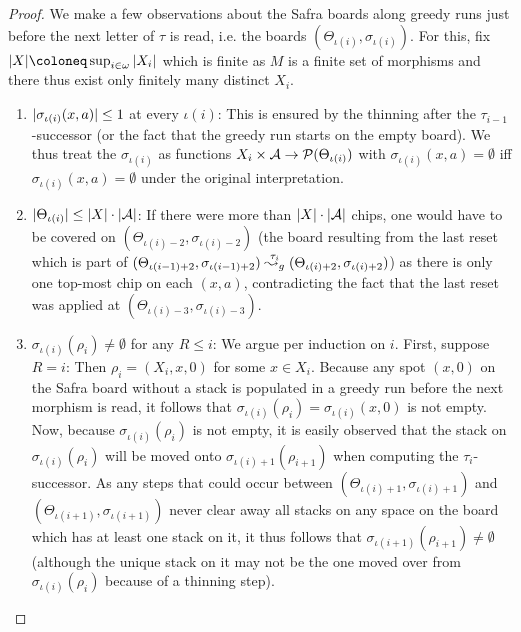 \begin{proof}
  We make a few observations about the Safra boards along greedy runs just
  before the next letter of $\tau$ is read, i.e. the boards $(\Theta_{\iota(i)},
  \sigma_{\iota(i)})$. For this, fix $\abs{X} \coloneq
  \sup_{i \in \omega} \abs{X_i}$ which is finite as $M$ is a finite set
  of morphisms and there thus exist only finitely many distinct $X_i$.
  \begin{enumerate}
  \item 
    $|\sigma_{\iota(i)}(x, a)| \leq 1$ at every $\iota(i)$: This is ensured
    by the thinning after the $\tau_{i - 1}$-successor (or the fact that the
    greedy run starts on the empty board).
    We thus
    treat the $\sigma_{\iota(i)}$ as functions $X_i \times \mathcal{A} \to
    \mathcal{P}(\Theta_{\iota(i)})$ with $\sigma_{\iota(i)}(x, a) =
    \emptyset$ iff $\sigma_{\iota(i)}(x, a) = \emptyset$ under the original
    interpretation.
  \item 
    $|\Theta_{\iota(i)}| \leq |X| \cdot |\mathcal{A}|$: If there were
    more than $|X| \cdot |\mathcal{A}|$ chips, one would have to be covered on
    $(\Theta_{\iota(i) - 2}, \sigma_{\iota(i) - 2})$ (the board resulting from
    the last reset which is part of $(\Theta_{\iota(i - 1) + 2}, \sigma_{\iota(i
      - 1) + 2}) \stackrel{\tau_i}{\leadsto_g} (\Theta_{\iota(i) + 2}, \sigma_{\iota(i) + 2})$) as there is only one
    top-most chip on each $(x, a)$, contradicting the fact that the last reset
    was applied at $(\Theta_{\iota(i) - 3}, \sigma_{\iota(i) - 3})$.
  \item $\sigma_{\iota(i)}(\rho_i) \neq \emptyset$ for any $R \leq i$: We argue
    per induction on $i$. First, suppose $R = i$: Then $\rho_i = (X_i,
    x, 0)$ for
    some $x \in X_i$. Because any spot $(x, 0)$ on the Safra board without a
    stack is populated in a greedy run before the next morphism is read, it
    follows
    that $\sigma_{\iota(i)}(\rho_i) = \sigma_{\iota(i)}(x, 0)$ is not empty.
    Now, because $\sigma_{\iota(i)}(\rho_i)$ is not empty, it is easily
    observed that the stack on $\sigma_{\iota(i)}(\rho_i)$ will be moved onto
    $\sigma_{\iota(i) + 1}(\rho_{i + 1})$ when computing the $\tau_i$-successor.
    As any steps that could occur between $(\Theta_{\iota(i) + 1},
    \sigma_{\iota(i) + 1})$ and $(\Theta_{\iota(i + 1)}, \sigma_{\iota(i + 1)})$
    never clear away all stacks on any space on the board which has at least one
    stack on it, it thus follows that $\sigma_{\iota(i + 1)}(\rho_{i + 1})
    \neq \emptyset$ (although the unique stack on it may not be the one
    moved over from $\sigma_{\iota(i)}(\rho_i)$ because of a thinning step).

\end{enumerate}
\end{proof}

